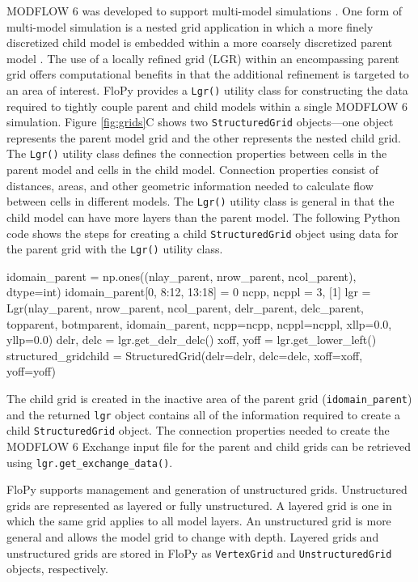 \documentclass[12pt, oneside]{article}  	%
\begin{document}
MODFLOW 6 was developed to support multi-model simulations \citep{modflow6framework}. One form of multi-model simulation is a nested grid application in which a more finely discretized child model is embedded within a more coarsely discretized parent model \citep{modflowlgr, vilhelmsen2012evaluation, modflowlgr2, fienen2022simulation}. The use of a locally refined grid (LGR) within an encompassing parent grid offers computational benefits in that the additional refinement is targeted to an area of interest. FloPy provides a \texttt{Lgr()} utility class for constructing the data required to tightly couple parent and child models within a single MODFLOW 6 simulation. Figure \ref{fig:grids}C shows two \texttt{StructuredGrid} objects---one object represents the parent model grid and the other represents the nested child grid. The \texttt{Lgr()} utility class defines the connection properties between cells in the parent model and cells in the child model. Connection properties consist of distances, areas, and other geometric information needed to calculate flow between cells in different models. The \texttt{Lgr()} utility class is general in that the child model can have more layers than the parent model. The following Python code shows the steps for creating a child \texttt{StructuredGrid} object using data for the parent grid with the \texttt{Lgr()} utility class.

\begin{python}
idomain_parent = np.ones((nlay_parent, nrow_parent, ncol_parent), dtype=int)
idomain_parent[0, 8:12, 13:18] = 0
ncpp, ncppl = 3, [1]
lgr = Lgr(nlay_parent, nrow_parent, ncol_parent,
          delr_parent, delc_parent, topparent, botmparent,
          idomain_parent, ncpp=ncpp, ncppl=ncppl, 
          xllp=0.0, yllp=0.0)
delr, delc = lgr.get_delr_delc()
xoff, yoff = lgr.get_lower_left()
structured_gridchild = StructuredGrid(delr=delr, delc=delc,
                                      xoff=xoff, yoff=yoff)
\end{python}

\noindent The child grid is created in the inactive area of the parent grid (\texttt{idomain\_parent}) and the returned \texttt{lgr} object contains all of the information required to create a child \texttt{StructuredGrid} object. The connection properties needed to create the MODFLOW 6 Exchange input file for the parent and child grids can be retrieved using \texttt{lgr.get\_exchange\_data()}.

FloPy supports management and generation of unstructured grids. Unstructured grids are represented as layered or fully unstructured. A layered grid is one in which the same grid applies to all model layers. An unstructured grid is more general and allows the model grid to change with depth. Layered grids and unstructured grids are stored in FloPy as \texttt{VertexGrid} and \texttt{UnstructuredGrid} objects, respectively.
\end{document}
